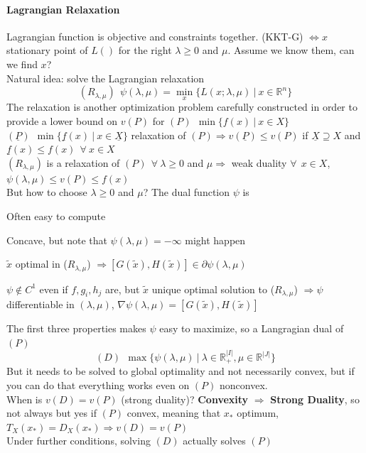 \documentclass[10pt]{report}
\begin{document}
\paragraph{Lagrangian Relaxation} Lagrangian function is objective and constraints together. (KKT-G) $\Leftrightarrow x$ stationary point of $L()$ for the right $\lambda\geq 0$ and $\mu$. Assume we know them, can we find $x$?\\
Natural idea: solve the Lagrangian relaxation $$(R_{\lambda,\mu})\:\:\psi(\lambda,\mu) = \min_x\{L(x;\lambda, \mu)\:|\:x\in \mathbb{R}^n\}$$
The relaxation is another optimization problem carefully constructed in order to provide a lower bound on $v(P)$ for $(P)\:\:\min\{f(x)\:|\:x\in X\}$\\
$(\underline{P})\:\:\min\{\underline{f}(x)\:|\:x\in \underline{X}\}$ relaxation of $(P) \Rightarrow v(\underline{P})\leq v(P)$ if $\underline{X}\supseteq X$ and $\underline{f}(x)\leq f(x)\:\:\forall\:x\in X$\\
$(R_{\lambda,\mu})$ is a relaxation of $(P)\:\:\forall\:\lambda\geq 0$ and $\mu\Rightarrow$ weak duality $\forall\:\:x\in X$, $\psi(\lambda,\mu)\leq v(P)\leq f(x)$\\
But how to choose $\lambda\geq 0$ and $\mu$? The dual function $\psi$ is \begin{list}{}{}
	\item Often easy to compute
	\item Concave, but note that $\psi(\lambda,\mu)=-\infty$ might happen
	\item $\tilde{x}$ optimal in ($R_{\lambda,\mu}$) $\Rightarrow [G(\tilde{x}), H(\tilde{x})]\in \partial\psi(\lambda,\mu)$
	\item $\psi\not\in C^1$ even if $f,g_i,h_j$ are, but $\tilde{x}$ unique optimal solution to ($R_{\lambda,\mu}$) $\Rightarrow \psi$ differentiable in $(\lambda, \mu)$, $\nabla \psi(\lambda, \mu)= [G(\tilde{x}), H(\tilde{x})]$
\end{list}
The first three properties makes $\psi$ easy to maximize, so a Langragian dual of $(P)$ $$(D)\:\:\max\{\psi(\lambda,\mu)\:|\:\lambda\in \mathbb{R}_+^{|I|},\mu\in \mathbb{R}^{|J|}\}$$ But it needs to be solved to global optimality and not necessarily convex, but if you can do that everything works even on $(P)$ nonconvex.\\
When is $v(D) = v(P)$ (strong duality)?  \textbf{Convexity} $\Rightarrow$ \textbf{Strong Duality}, so not always but yes if $(P)$ convex, meaning that $x_*$ optimum, $T_X(x_*)=D_X(x_*)\Rightarrow v(D) = v(P)$\\
Under further conditions, solving $(D)$ actually solves $(P)$
\end{document}
